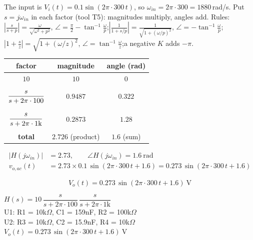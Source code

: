 \documentclass[11pt]{article}
\begin{document}
The input is $V_i(t) = 0.1\sin\left(2\pi\cdot 300\,t\right)$, so $\omega_{in} = 2\pi\cdot 300 = 1880$\,rad/s. Put $s=j\omega_{in}$ in each factor (tool T5): magnitudes multiply, angles add.
{\small Rules: $\left|\frac{s}{s+p}\right| = \frac{\omega}{\sqrt{\omega^2+p^2}}$, $\angle = \frac{\pi}{2}-\tan^{-1}\frac{\omega}{p}$;\quad $\left|\frac{1}{1+s/p}\right| = \frac{1}{\sqrt{1+(\omega/p)^2}}$, $\angle = -\tan^{-1}\frac{\omega}{p}$;\quad $\left|1+\frac{s}{z}\right| = \sqrt{1+(\omega/z)^2}$, $\angle = \tan^{-1}\frac{\omega}{z}$;\quad a negative $K$ adds $-\pi$.}
\begin{center}\renewcommand{\arraystretch}{1.35}
\begin{tabular}{ccc}
\toprule
factor & magnitude & angle (rad) \\
\midrule
$10$ & $10$ & $0$ \\
$\rule[-1.1em]{0pt}{2.8em}\dfrac{s}{s+2\pi\cdot 100}$ & $0.9487$ & $0.322$ \\
$\rule[-1.1em]{0pt}{2.8em}\dfrac{s}{s+2\pi\cdot 1\mathrm{k}}$ & $0.2873$ & $1.28$ \\
\textbf{total} & $\mathbf{2.726}$ (product) & $\mathbf{1.6}$ (sum) \\
\bottomrule
\end{tabular}\end{center}

\begin{align*}
|H(j\omega_{in})| &= 2.73, \qquad \angle H(j\omega_{in}) = 1.6\ \mathrm{rad} \\
v_{o,ac}(t) &= 2.73\times 0.1\,\sin\left(2\pi\cdot 300\,t + 1.6\right) = 0.273\,\sin\left(2\pi\cdot 300\,t + 1.6\right)
\end{align*}

\[
\boxed{V_o(t) = 0.273\,\sin\left(2\pi\cdot 300\,t + 1.6\right)\ \mathrm{V}}
\]

\begin{ansbox}
$H(s) = 10\,\dfrac{s}{s+2\pi\cdot 100}\,\dfrac{s}{s+2\pi\cdot 1\mathrm{k}}$\\[4pt]
U1: R1 = 10k$\Omega$, C1 = 159nF, R2 = 100k$\Omega$\\
U2: R3 = 10k$\Omega$, C2 = 15.9nF, R4 = 10k$\Omega$\\[4pt]
$V_o(t) = 0.273\,\sin\left(2\pi\cdot 300\,t + 1.6\right)\ \mathrm{V}$
\end{ansbox}

\newpage
\end{document}
